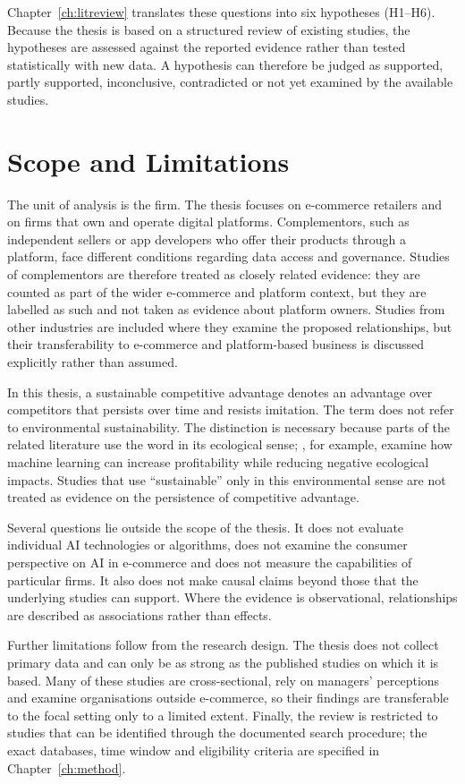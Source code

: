 Chapter~\ref{ch:litreview} translates these questions into six hypotheses (H1--H6). Because the thesis is based on a structured review of existing studies, the hypotheses are assessed against the reported evidence rather than tested statistically with new data. A hypothesis can therefore be judged as supported, partly supported, inconclusive, contradicted or not yet examined by the available studies.

\section{Scope and Limitations}
\label{sec:scope}

The unit of analysis is the firm. The thesis focuses on e-commerce retailers and on firms that own and operate digital platforms. Complementors, such as independent sellers or app developers who offer their products through a platform, face different conditions regarding data access and governance. Studies of complementors are therefore treated as closely related evidence: they are counted as part of the wider e-commerce and platform context, but they are labelled as such and not taken as evidence about platform owners. Studies from other industries are included where they examine the proposed relationships, but their transferability to e-commerce and platform-based business is discussed explicitly rather than assumed.

In this thesis, a sustainable competitive advantage denotes an advantage over competitors that persists over time and resists imitation. The term does not refer to environmental sustainability. The distinction is necessary because parts of the related literature use the word in its ecological sense; \textcite{haftor2021}, for example, examine how machine learning can increase profitability while reducing negative ecological impacts. Studies that use \enquote{sustainable} only in this environmental sense are not treated as evidence on the persistence of competitive advantage.

Several questions lie outside the scope of the thesis. It does not evaluate individual AI technologies or algorithms, does not examine the consumer perspective on AI in e-commerce and does not measure the capabilities of particular firms. It also does not make causal claims beyond those that the underlying studies can support. Where the evidence is observational, relationships are described as associations rather than effects.

Further limitations follow from the research design. The thesis does not collect primary data and can only be as strong as the published studies on which it is based. Many of these studies are cross-sectional, rely on managers' perceptions and examine organisations outside e-commerce, so their findings are transferable to the focal setting only to a limited extent. Finally, the review is restricted to studies that can be identified through the documented search procedure; the exact databases, time window and eligibility criteria are specified in Chapter~\ref{ch:method}.

